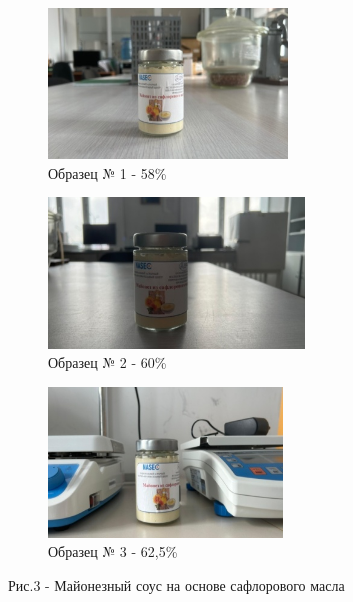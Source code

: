 \begin{figure}[H]
    \centering
    \begin{subfigure}[t]{0.3\textwidth}
        \centering
        \includegraphics[width=\textwidth, height=4cm]{media/pish2/image70}
        \caption*{Образец № 1 - 58\%}
    \end{subfigure}
    \begin{subfigure}[t]{0.3\textwidth}
        \centering
        \includegraphics[width=\textwidth, height=4cm]{media/pish2/image71}
        \caption*{Образец № 2 - 60\%}
    \end{subfigure}
    \begin{subfigure}[t]{0.3\textwidth}
        \centering
        \includegraphics[width=\textwidth, height=4cm]{media/pish2/image72}
        \caption*{Образец № 3 - 62,5\%}
    \end{subfigure}
    \caption*{Рис.3 - Майонезный соус на основе сафлорового масла}
\end{figure}


